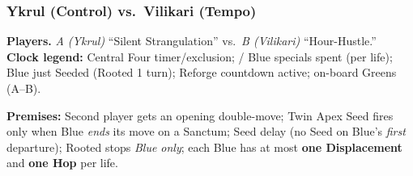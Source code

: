 \documentclass[11pt]{article}
\newcommand{\CC}[1]{\textcolor{blue!60!black}{\scriptsize\ttfamily[CF:#1]}}
\newcommand{\SC}[1]{\textcolor{red!60!black}{\scriptsize\ttfamily[S:#1]}}
\newcommand{\RoC}{\textcolor{teal!60!black}{\scriptsize\ttfamily[Rooted]}}
\newcommand{\RC}{\textcolor{purple!70!black}{\scriptsize\ttfamily[RC]}}
\newcommand{\CapC}[1]{\textcolor{green!40!black}{\scriptsize\ttfamily[G:#1]}}
\renewcommand{\RC}[1][]{%
  \textcolor{purple!70!black}{\scriptsize\ttfamily[RC%
  \if\relax\detokenize{#1}\relax\else~#1\fi]}}
\begin{document}
\subsubsection*{Ykrul (Control) vs.\ Vilikari (Tempo)}

\noindent\textbf{Players.} \textit{A (Ykrul)} ``Silent Strangulation'' vs.\ \textit{B (Vilikari)} ``Hour-Hustle.''\\
\textbf{Clock legend:} \CC{\dots} Central Four timer/exclusion;\; \SC{D}/\SC{H} Blue specials spent (per life);\; \RoC{} Blue just Seeded (Rooted 1 turn);\; \RC{} Reforge countdown active;\; \CapC{a--b} on-board Greens (A--B).

\medskip
\noindent\textbf{Premises:} Second player gets an opening double-move; Twin Apex Seed fires only when Blue \emph{ends} its move on a Sanctum; Seed delay (no Seed on Blue's \emph{first} departure); Rooted stops \emph{Blue only}; each Blue has at most \textbf{one Displacement} and \textbf{one Hop} per life.

\bigskip
\end{document}
